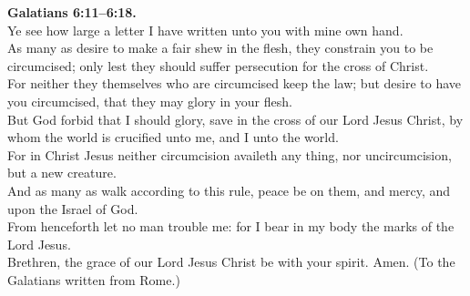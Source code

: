 \documentclass[10pt]{article} %
\begin{document}
{\begin{minipage}[t]{0.45\textwidth}
\textbf{Galatians 6:11--6:18.}\\
Ye see how large a letter I have written unto you with mine own hand.\\
As many as desire to make a fair shew in the flesh, they constrain you to be circumcised; only lest they should suffer persecution for the cross of Christ.\\
For neither they themselves who are circumcised keep the law; but desire to have you circumcised, that they may glory in your flesh.\\
But God forbid that I should glory, save in the cross of our Lord Jesus Christ, by whom the world is crucified unto me, and I unto the world.\\
For in Christ Jesus neither circumcision availeth any thing, nor uncircumcision, but a new creature.\\
And as many as walk according to this rule, peace be on them, and mercy, and upon the Israel of God.\\
From henceforth let no man trouble me: for I bear in my body the marks of the Lord Jesus.\\
Brethren, the grace of our Lord Jesus Christ be with your spirit. Amen. (To the Galatians written from Rome.)\\

\end{minipage}}
\vspace*{\fill}
\newpage
\Huge%
\vspace*{\fill}
\begin{spacing}{1.3}%
\end{spacing}
\vspace*{\fill}
\end{document}
